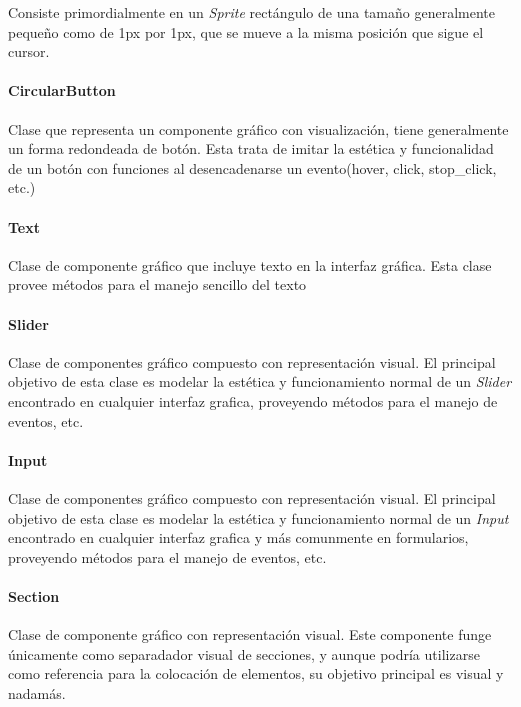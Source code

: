 \documentclass[]{article}
\begin{document}
			Consiste primordialmente en un \textit{Sprite} rectángulo de una tamaño generalmente pequeño como de 1px por 1px, que se mueve a la misma posición que sigue el cursor.
			
			\paragraph{CircularButton}
			Clase que representa un componente gráfico con visualización, tiene generalmente un forma redondeada de botón. Esta trata de imitar la estética y funcionalidad de un botón con funciones al desencadenarse un evento(hover, click, stop\_click, etc.)
			
			\paragraph{Text}
			Clase de componente gráfico que incluye texto en la interfaz gráfica. Esta clase provee métodos para el manejo sencillo del texto
			
			\paragraph{Slider}
			Clase de componentes gráfico compuesto con representación visual. El principal objetivo de esta clase es modelar la estética y funcionamiento normal de un \textit{Slider} encontrado en cualquier interfaz grafica, proveyendo métodos para el manejo de eventos, etc.
			
			\paragraph{Input}
			Clase de componentes gráfico compuesto con representación visual. El principal objetivo de esta clase es modelar la estética y funcionamiento normal de un \textit{Input} encontrado en cualquier interfaz grafica y más comunmente en formularios, proveyendo métodos para el manejo de eventos, etc.
			
			\paragraph{Section}
			Clase de componente gráfico con representación visual. Este componente funge únicamente como separadador visual de secciones, y aunque podría utilizarse como referencia para la colocación de elementos, su objetivo principal es visual y nadamás.
			
			
		
\end{document}
